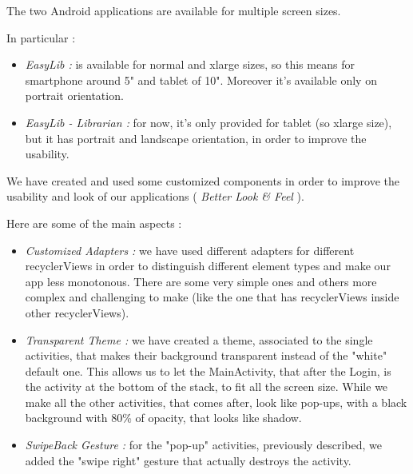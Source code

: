 \vspace*{-5mm}

The two Android applications are available for multiple screen sizes.\par
In particular :
\begin{itemize}
	\item \emph{EasyLib :} is available for normal and xlarge sizes, so this means for smartphone around 5" and tablet of 10". Moreover it's available only on portrait orientation.
	\item \emph{EasyLib - Librarian :} for now, it's only provided for tablet (so xlarge size), but it has portrait and landscape orientation, in order to improve the usability.
\end{itemize}


We have created and used some customized components in order to improve the usability and look of our applications ( \emph{Better Look \& Feel} ).\par
Here are some of the main aspects :
\begin{itemize}
	\item \emph{Customized Adapters :} we have used different adapters for different recyclerViews in order to distinguish different element types and make our app less monotonous. There are some very simple ones and others more complex and challenging to make (like the one that has recyclerViews inside other recyclerViews).
	\item \emph{Transparent Theme :} we have created a theme, associated to the single activities, that makes their background transparent instead of the "white" default one. This allows us to let the MainActivity, that after the Login, is the activity at the bottom of the stack, to fit all the screen size. While we make all the other activities, that comes after, look like pop-ups, with a black background with 80\% of opacity, that looks like shadow.
	\item \emph{SwipeBack Gesture :} for the "pop-up" activities, previously described, we added the "swipe right" gesture that actually destroys the activity.
\end{itemize}

\newpage
{}

